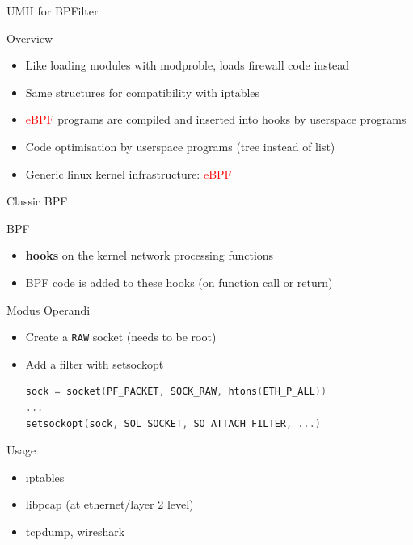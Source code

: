 \begin{reveals}
\begin{frame}[c]{UMH for BPFilter}
  \begin{block}{Overview}
    \begin{itemize}
    \item Like loading modules with modproble, loads firewall code instead
    \item Same structures for compatibility with iptables
    \item \textcolor{red}{eBPF} programs are compiled and inserted
      into hooks by userspace programs
    \item Code optimisation by userspace programs (tree instead of
      list)
    \item Generic linux kernel infrastructure: \textcolor{red}{eBPF}
    \end{itemize}
  \end{block}


\end{frame}

\begin{frame}[c,fragile]{Classic BPF}
  
  \begin{block}{BPF}
    \begin{itemize}
    \item \textbf{hooks} on the kernel network processing functions
    \item BPF code is added to these hooks (on function call or return)
    \end{itemize}
  \end{block}

  \vfill

  \begin{block}{Modus Operandi}
    \begin{itemize}
    \item Create a \texttt{RAW} socket (needs to be root)
    \item Add a filter with setsockopt
\begin{lstlisting}[language=C]
sock = socket(PF_PACKET, SOCK_RAW, htons(ETH_P_ALL))
...
setsockopt(sock, SOL_SOCKET, SO_ATTACH_FILTER, ...)
\end{lstlisting}
    \end{itemize}
  \end{block}

  \vfill

  \begin{block}{Usage}
    \begin{itemize}
    \item iptables
    \item libpcap (at ethernet/layer 2 level)
    \item tcpdump, wireshark
    \end{itemize}
  \end{block}


\end{frame}
\end{reveals}
